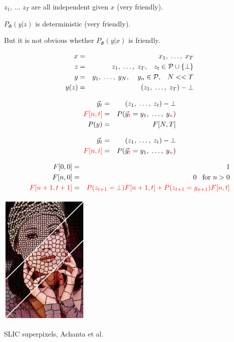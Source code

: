 {\vfill
$z_1$, $\ldots$ $z_T$ are {\color{red}  all independent} given $x$ (very friendly).

\vfill
$P_\Phi(y|z)$ is {\color{red} deterministic} (very friendly).

\vfill
{\color{red} But it is not obvious whether $P_\Phi(y|x)$ is friendly.}


\begin{eqnarray*}
  x & = & x_1,\;\ldots,\; x_T \\
  z & = & z_1, \;\ldots,\;z_T,\;\;\;z_t \in {\cal P}\cup \{\bot\} \\
  y & = & y_1,\;\ldots,\;y_N,\;\;\;\;y_n \in {\cal P},\;\;\;N << T \\
  y(z) & = & (z_1,\;\ldots,\;z_T) - \bot
\end{eqnarray*}

\vfill

\begin{eqnarray*}
  \vec{y}_t & = & (z_1,\;\ldots,\;z_t)-\bot \\
  {\color{red} F[n,t]} & = & P(\vec{y}_{\color{red} t} = y_1,\;\ldots,\;y_{\color{red} n}) \\
  P(y) & = & F[N,T]
\end{eqnarray*}


\begin{eqnarray*}
  \vec{y}_t & = & (z_1,\;\ldots,\;z_t)-\bot \\
  {\color{red} F[n,t]} & = & P(\vec{y}_{\color{red} t} = y_1,\;\ldots,\;y_{\color{red} n}) \\
\end{eqnarray*}

\begin{eqnarray*}
  F[0,0] & = & 1 \\
  F[n,0] & = & 0 \;\;\;\mbox{for $n > 0$} \\
  {\color{red} F[n+1,t+1]} & = & {\color{red} P(z_{t+1} = \bot) F[n+1,t] + P(z_{t+1} = y_{n+1})F[n,t]}
\end{eqnarray*}

\centerline{\includegraphics[height = 2.5in]{../images/SLICcolor}}
\centerline{\huge SLIC superpixels, Achanta et al.}

}
